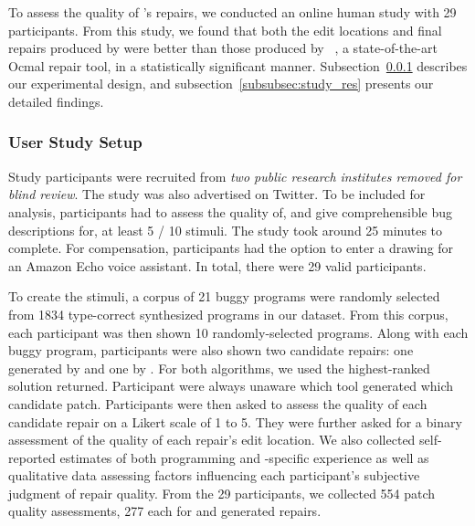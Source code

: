 To assess the quality of \toolname's repairs, we conducted an online human
study with 29 participants. From this study, we found that both the edit
locations and final repairs produced by \toolname were better than those
produced by \seminal~\citep{Lerner2006-pj, Lerner2007-dt}, a state-of-the-art 
Ocmal repair tool, in a statistically significant manner. 
Subsection~\ref{subsubsec:qual_study_setup} describes our experimental design, 
and subsection~\ref{subsubsec:study_res} presents our detailed findings.

\subsubsection{User Study Setup}
\label{subsubsec:qual_study_setup}

Study participants were recruited from \emph{two public research
institutes removed for blind review}. The study was also advertised on Twitter.
To be included for analysis, participants had to assess the quality of, and give
comprehensible bug descriptions for, at least 5 / 10 stimuli. The study took around 
25 minutes to complete. For compensation, participants had the option to enter a
drawing for an Amazon Echo voice assistant. In total, there were
29 valid participants.

To create the stimuli, a corpus of 21 buggy programs were randomly selected from
1834 type-correct synthesized programs in our dataset. From this corpus, each 
participant was then shown 10 randomly-selected programs. Along with each buggy 
program, participants were also shown two candidate repairs: one generated by 
\toolname and one by \seminal. For both algorithms, we used the highest-ranked
solution returned. Participant were always unaware which tool generated which
candidate patch. Participants were then asked to assess the quality of each
candidate repair on a Likert scale of 1 to 5. They were further asked for a
binary assessment of the quality of each repair's edit location. 
We also collected self-reported estimates of both programming and
\ocaml-specific experience as well as qualitative data assessing factors
influencing each participant's subjective judgment of repair quality.
From the 29 participants, we collected 554 patch quality assessments, 277 each
for \toolname and \seminal generated repairs. 


